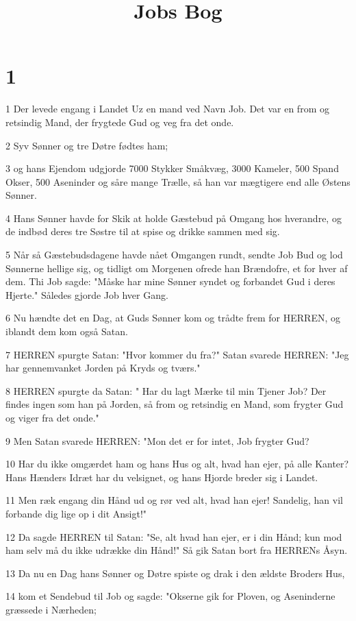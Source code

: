 

\title{Jobs Bog}


\chapter{1}

\par 1 Der levede engang i Landet Uz en mand ved Navn Job. Det var en from og retsindig Mand, der frygtede Gud og veg fra det onde.
\par 2 Syv Sønner og tre Døtre fødtes ham;
\par 3 og hans Ejendom udgjorde 7000 Stykker Småkvæg, 3000 Kameler, 500 Spand Okser, 500 Aseninder og såre mange Trælle, så han var mægtigere end alle Østens Sønner.
\par 4 Hans Sønner havde for Skik at holde Gæstebud på Omgang hos hverandre, og de indbød deres tre Søstre til at spise og drikke sammen med sig.
\par 5 Når så Gæstebudsdagene havde nået Omgangen rundt, sendte Job Bud og lod Sønnerne hellige sig, og tidligt om Morgenen ofrede han Brændofre, et for hver af dem. Thi Job sagde: "Måske har mine Sønner syndet og forbandet Gud i deres Hjerte." Således gjorde Job hver Gang.
\par 6 Nu hændte det en Dag, at Guds Sønner kom og trådte frem for HERREN, og iblandt dem kom også Satan.
\par 7 HERREN spurgte Satan: "Hvor kommer du fra?" Satan svarede HERREN: "Jeg har gennemvanket Jorden på Kryds og tværs."
\par 8 HERREN spurgte da Satan: " Har du lagt Mærke til min Tjener Job? Der findes ingen som han på Jorden, så from og retsindig en Mand, som frygter Gud og viger fra det onde."
\par 9 Men Satan svarede HERREN: "Mon det er for intet, Job frygter Gud?
\par 10 Har du ikke omgærdet ham og hans Hus og alt, hvad han ejer, på alle Kanter? Hans Hænders Idræt har du velsignet, og hans Hjorde breder sig i Landet.
\par 11 Men ræk engang din Hånd ud og rør ved alt, hvad han ejer! Sandelig, han vil forbande dig lige op i dit Ansigt!"
\par 12 Da sagde HERREN til Satan: "Se, alt hvad han ejer, er i din Hånd; kun mod ham selv må du ikke udrække din Hånd!" Så gik Satan bort fra HERRENs Åsyn.
\par 13 Da nu en Dag hans Sønner og Døtre spiste og drak i den ældste Broders Hus,
\par 14 kom et Sendebud til Job og sagde: "Okserne gik for Ploven, og Aseninderne græssede i Nærheden;
